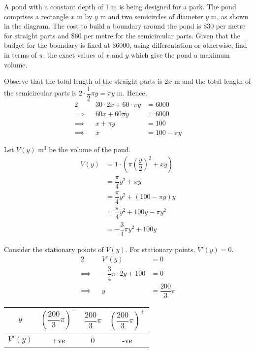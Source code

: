 \documentclass{echw}
\begin{document}
         A pond with a constant depth of 1 m is being designed for a park. The pond comprises a rectangle $x$ m by $y$ m and two semicircles of diameter $y$ m, as shown in the diagram. The cost to build a boundary around the pond is \$30 per metre for straight parts and \$60 per metre for the semicircular parts. Given that the budget for the boundary is fixed at \$6000, using differentation or otherwise, find in terms of $\pi$, the exact values of $x$ and $y$ which give the pond a maximum volume.

    \solution
        Observe that the total length of the straight parts is $2x$ m and the total length of the semicircular parts is $2 \cdot \dfrac12 \pi y = \pi y$ m. Hence,
        \begin{alignat*}{2}
            &&30 \cdot 2x + 60 \cdot \pi y &= 6000\\
            \implies&&60x + 60 \pi y &= 6000\\
            \implies&&x + \pi y &= 100\\
            \implies&&x &= 100 - \pi y
        \end{alignat*}

        Let $V(y)$ m$^3$ be the volume of the pond.
        \begin{align*}
            V(y) &= 1 \cdot \left(\pi \left(\dfrac{y}2\right)^2 + xy\right)\\
            &= \dfrac{\pi}4 y^2 + xy\\
            &= \dfrac{\pi}4 y^2 + (100 - \pi y )y\\
            &= \dfrac{\pi}4 y^2 + 100y - \pi y^2\\
            &= - \dfrac{3}4 \pi y^2 + 100y
        \end{align*}

        Consider the stationary points of $V(y)$. For stationary points, $V'(y) = 0$.
        \begin{alignat*}{2}
            &&V'(y) &= 0\\
            \implies&&-\dfrac34 \pi \cdot 2y + 100 &= 0\\
            \implies&& y &= \dfrac{200}3 \pi
        \end{alignat*}

        \begin{table}[h]
            \centering
            \begin{tabular}{|c|c|c|c|}
            \hline
            $y$ & $\left(\dfrac{200}3 \pi\right)^-$ & $\dfrac{200}3 \pi$ & $\left(\dfrac{200}3 \pi\right)^+$ \\\hline
            $V'(y)$ & +ve   & 0 & -ve   \\[1ex]\hline
            \end{tabular}
        \end{table}
\end{document}
